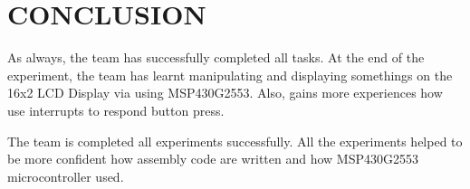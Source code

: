 \documentclass[pdftex,12pt,a4paper]{article}
\begin{document}
\section{CONCLUSION}


As always, the team has successfully completed all tasks. At the end of the experiment, the team has learnt manipulating and displaying somethings on the 16x2 LCD Display via using MSP430G2553. Also, gains more experiences how use interrupts to respond button press.

The team is completed all experiments successfully. All the experiments helped to be more confident how assembly code are written and how MSP430G2553 microcontroller used.

\nocite{overleaf}
\nocite{reportGuide}
\newpage
{}



\end{document}
